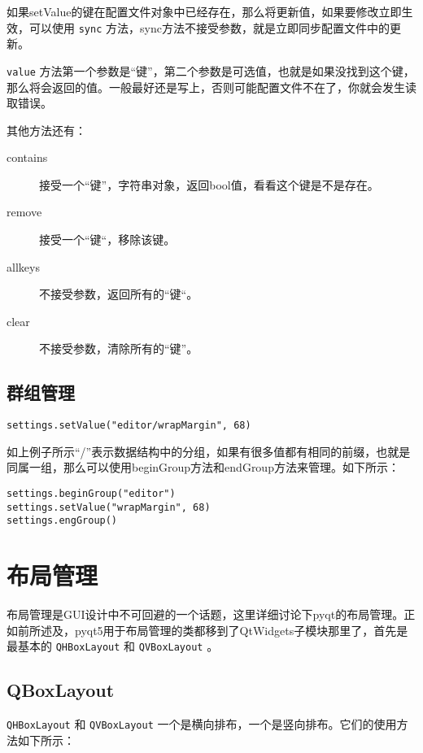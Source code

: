 \documentclass[11pt,oneside]{article}
\begin{document}
如果setValue的键在配置文件对象中已经存在，那么将更新值，如果要修改立即生效，可以使用 \texttt{sync} 方法，sync方法不接受参数，就是立即同步配置文件中的更新。

\texttt{value} 方法第一个参数是“键”，第二个参数是可选值，也就是如果没找到这个键，那么将会返回的值。一般最好还是写上，否则可能配置文件不在了，你就会发生读取错误。


其他方法还有：
\begin{description}
\item[{contains}] 接受一个“键”，字符串对象，返回bool值，看看这个键是不是存在。
\item[{remove}] 接受一个“键“，移除该键。
\item[{allkeys}] 不接受参数，返回所有的“键“。
\item[{clear}] 不接受参数，清除所有的“键”。
\end{description}



\subsection{群组管理}
\label{sec:orgheadline32}
\begin{Verbatim}
settings.setValue("editor/wrapMargin", 68)
\end{Verbatim}

如上例子所示“/”表示数据结构中的分组，如果有很多值都有相同的前缀，也就是同属一组，那么可以使用beginGroup方法和endGroup方法来管理。如下所示：

\begin{Verbatim}
settings.beginGroup("editor")
settings.setValue("wrapMargin", 68)
settings.engGroup()
\end{Verbatim}



\section{布局管理}
\label{sec:orgheadline38}
布局管理是GUI设计中不可回避的一个话题，这里详细讨论下pyqt的布局管理。正如前所述及，pyqt5用于布局管理的类都移到了QtWidgets子模块那里了，首先是最基本的 \texttt{QHBoxLayout} 和 \texttt{QVBoxLayout} 。

\subsection{QBoxLayout}
\label{sec:orgheadline34}
\texttt{QHBoxLayout} 和 \texttt{QVBoxLayout} 一个是横向排布，一个是竖向排布。它们的使用方法如下所示：
\end{document}
